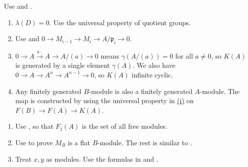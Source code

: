 \begin{exercise}\label{ex7.25}
	Use  and .
\end{exercise}

\begin{exercise}\label{ex7.26}
	\begin{enumerate}[label=(\roman*),ref=\theexercise(\roman*)]
		\item\label{ex7.26.1} $\lambda(D)=0$. Use the universal property of quotient groups.
		\item Use  and $0\rightarrow M_{i-1}\rightarrow M_i\rightarrow A/\mathfrak{p}_i\rightarrow0$.
		\item $0\rightarrow A\xrightarrow{a\cdot}A\rightarrow A/(a)\rightarrow0$ means $\gamma(A/(a))=0$ for all $a\neq0$, so $K(A)$ is generated by a single element $\gamma(A)$. We also have $0\rightarrow A\rightarrow A^n\rightarrow A^{n-1}\rightarrow0$, so $K(A)$ infinite cyclic.
		\item\label{ex7.26.4} Any finitely generated $B$-module is also a finitely generated $A$-module. The map is constructed by using the universal property in \hyperref[ex7.26.1]{(i)} on $F(B)\rightarrow F(A)\rightarrow K(A)$.
	\end{enumerate}
\end{exercise}

\begin{exercise}\label{ex7.27}
	\begin{enumerate}[label=(\roman*),ref=\theexercise(\roman*)]
		\addtocounter{enumi}{2}
		\item Use , so that $F_1(A)$ is the set of all free modules.
		\item Use  to prove $M_B$ is a flat $B$-module. The rest is similar to .
		\item Treat $x,y$ as modules. Use the formulas in  and .
	\end{enumerate}
\end{exercise}